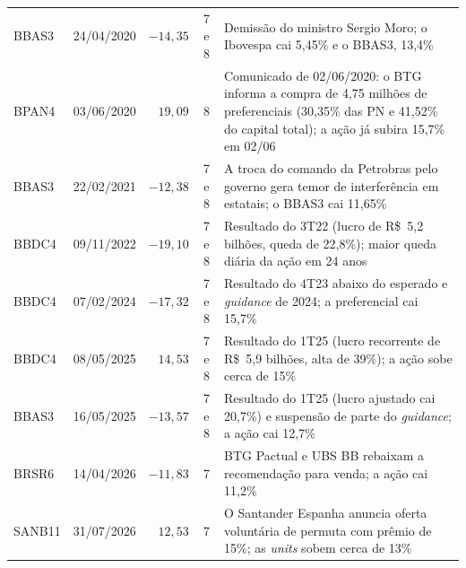 {\begin{longtable}{llrcp{7.2cm}}
BBAS3 & 24/04/2020 & $-14{,}35$ & 7 e 8 & Demissão do ministro Sergio Moro; o Ibovespa cai 5,45\% e o BBAS3, 13,4\% \parencite{moneytimes20200424} \\
BPAN4 & 03/06/2020 & $19{,}09$ & 8 & Comunicado de 02/06/2020: o BTG informa a compra de 4,75 milhões de preferenciais (30,35\% das PN e 41,52\% do capital total); a ação já subira 15,7\% em 02/06 \parencite{pan2020comunicado} \\
BBAS3 & 22/02/2021 & $-12{,}38$ & 7 e 8 & A troca do comando da Petrobras pelo governo gera temor de interferência em estatais; o BBAS3 cai 11,65\% \parencite{moneytimes20210222} \\
BBDC4 & 09/11/2022 & $-19{,}10$ & 7 e 8 & Resultado do 3T22 (lucro de R\$~5,2 bilhões, queda de 22,8\%); maior queda diária da ação em 24 anos \parencite{infomoney20221109} \\
BBDC4 & 07/02/2024 & $-17{,}32$ & 7 e 8 & Resultado do 4T23 abaixo do esperado e \textit{guidance} de 2024; a preferencial cai 15,7\% \parencite{moneytimes20240207} \\
BBDC4 & 08/05/2025 & $14{,}53$ & 7 e 8 & Resultado do 1T25 (lucro recorrente de R\$~5,9 bilhões, alta de 39\%); a ação sobe cerca de 15\% \parencite{moneytimes20250507, nord2025} \\
BBAS3 & 16/05/2025 & $-13{,}57$ & 7 e 8 & Resultado do 1T25 (lucro ajustado cai 20,7\%) e suspensão de parte do \textit{guidance}; a ação cai 12,7\% \parencite{moneytimes20250515, folhape2025} \\
BRSR6 & 14/04/2026 & $-11{,}83$ & 7 & BTG Pactual e UBS BB rebaixam a recomendação para venda; a ação cai 11,2\% \parencite{financenews20260414} \\
SANB11 & 31/07/2026 & $12{,}53$ & 7 & O Santander Espanha anuncia oferta voluntária de permuta com prêmio de 15\%; as \textit{units} sobem cerca de 13\% \parencite{investing20260731} \\
\end{longtable}}


